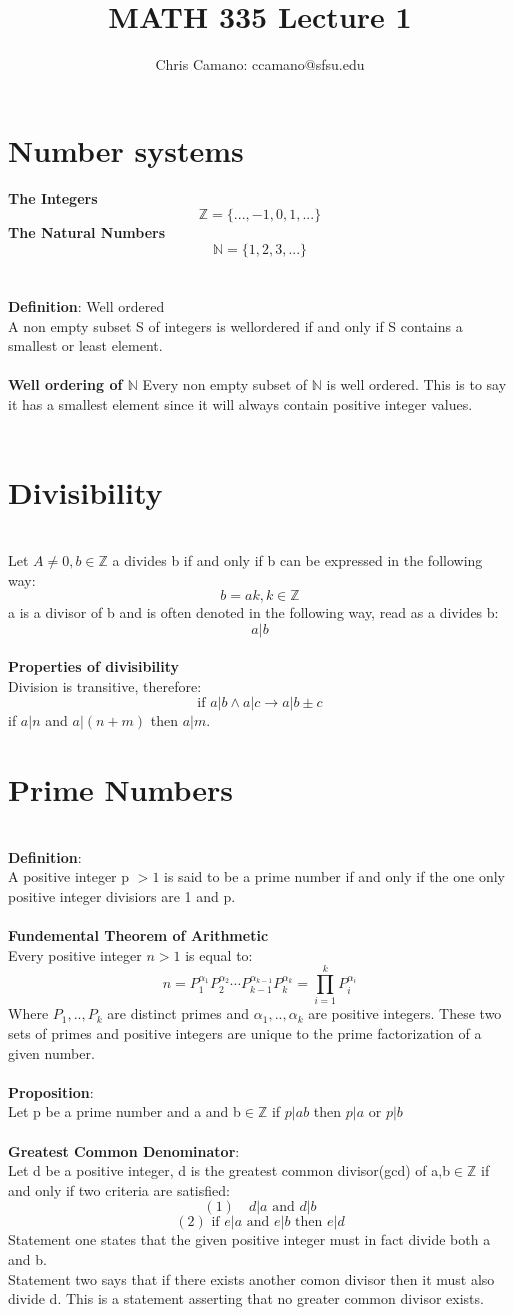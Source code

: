 \documentclass[12pt]{article}
\author{Chris Camano: ccamano@sfsu.edu}
\title{MATH 335  Lecture 1 }
\date
\newcommand{\sect}[1]{\section*{#1}}
\newcommand{\arr}{\rightarrow}
\newcommand{\Z}{\mathbb{Z}}
\newcommand{\N}{\mathbb{N}}
\begin{document}
\maketitle
\sect{Number systems}
\textbf{The Integers }\\
\[
  \Z=\{...,-1,0,1,...\}
\]
\textbf{The Natural Numbers}\\
\[
  \mathbb{N}=\{1,2,3,...\}
\]
\\
\\
\textbf{Definition}: Well ordered\\
A non empty subset S of integers is wellordered if and only if S contains a smallest or least element. \\\\
\textbf{Well ordering of $\N$} Every non empty subset of $\N$ is well ordered. This is to say it has a smallest element since it will always contain positive integer values. \\\
\sect{Divisibility}\\
Let $A \neq 0, b\in \Z$ a divides b if and only if b can be expressed in the following way:
\[
  b=ak,k \in \Z
\]
a is a divisor of b and is often denoted in the following way, read as a divides b:
\[
   a|b
\]\\
\textbf{Properties of divisibility}\\
Division is transitive, therefore:
\[
  \text{if } a|b \land a|c \arr a| b \pm c
\]
if $a|n$ and $a|(n+m)$ then $a|m$. \\
\sect{Prime Numbers}\\
\textbf{Definition}:\\
A positive integer p $>1$ is said to be a prime number if and only if the one only positive integer divisiors are 1 and p. \\\\
\textbf{Fundemental Theorem of Arithmetic}\\
Every positive integer $n>1$ is equal to:
\[
  n=P_1^{\alpha_1}P_2^{\alpha_2}\cdots P_{k-1}^{\alpha_{k-1}}P_k^{\alpha_k}=\prod_{i=1}^kP_i^{\alpha_i}
\]
Where $P_1,..,P_k$ are distinct primes and $\alpha_1,..,\alpha_k$ are positive integers. These two sets of primes and positive integers are unique to the prime factorization of a given number.\\\\
\textbf{Proposition}:\\
Let p be a prime number and a and b$\in \Z$ if $p|ab$ then $p|a$ or $p|b$\\\\
\textbf{Greatest Common Denominator}:\\
Let d be a positive integer, d is the greatest common divisor(gcd) of a,b$\in \Z$ if and only if two criteria are satisfied:
\[
  (1)\quad d|a \text{ and } d|b
\]
\[
  (2)\text{ if } e|a \text{ and } e|b \text{ then } e|d
\]
Statement one states that the given positive integer must in fact divide both a and b. \\
Statement two says that if there exists another comon divisor then it must also divide d. This is a statement asserting that no greater common divisor exists.
\end{document}

